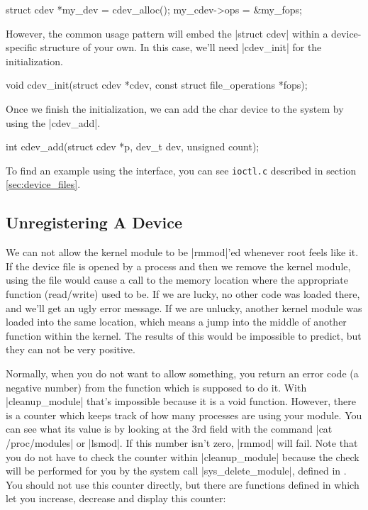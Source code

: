 \documentclass[10pt, oneside]{book}
\begin{document}
\begin{code}
struct cdev *my_dev = cdev_alloc();
my_cdev->ops = &my_fops;
\end{code}

However, the common usage pattern will embed the \cpp|struct cdev| within a device-specific structure of your own.
In this case, we'll need \cpp|cdev_init| for the initialization.

\begin{code}
void cdev_init(struct cdev *cdev, const struct file_operations *fops);
\end{code}

Once we finish the initialization, we can add the char device to the system by using the \cpp|cdev_add|.

\begin{code}
int cdev_add(struct cdev *p, dev_t dev, unsigned count);
\end{code}

To find an example using the interface, you can see \verb|ioctl.c| described in section \ref{sec:device_files}.

\subsection{Unregistering A Device}
\label{sec:unregister_device}
We can not allow the kernel module to be \sh|rmmod|'ed whenever root feels like it.
If the device file is opened by a process and then we remove the kernel module, using the file would cause a call to the memory location where the appropriate function (read/write) used to be.
If we are lucky, no other code was loaded there, and we'll get an ugly error message.
If we are unlucky, another kernel module was loaded into the same location, which means a jump into the middle of another function within the kernel.
The results of this would be impossible to predict, but they can not be very positive.

Normally, when you do not want to allow something, you return an error code (a negative number) from the function which is supposed to do it.
With \cpp|cleanup_module| that's impossible because it is a void function.
However, there is a counter which keeps track of how many processes are using your module.
You can see what its value is by looking at the 3rd field with the command \sh|cat /proc/modules| or \sh|lsmod|.
If this number isn't zero, \sh|rmmod| will fail.
Note that you do not have to check the counter within \cpp|cleanup_module| because the check will be performed for you by the system call \cpp|sys_delete_module|, defined in .
You should not use this counter directly, but there are functions defined in  which let you increase, decrease and display this counter:
\end{document}
